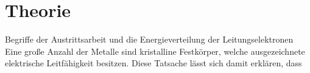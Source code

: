 \section{Theorie}
\label{sec:theorie}
Begriffe der Austrittsarbeit und die Energieverteilung der Leitungselektronen
Eine große Anzahl der Metalle sind kristalline Festkörper, welche ausgezeichnete elektrische Leitfähigkeit besitzen.
Diese Tatsache lässt sich damit erklären, dass 